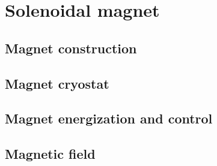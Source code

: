 \section{Solenoidal magnet}
\subsection{Magnet construction}
\subsection{Magnet cryostat}
\subsection{Magnet energization and control}
\subsection{Magnetic field}
